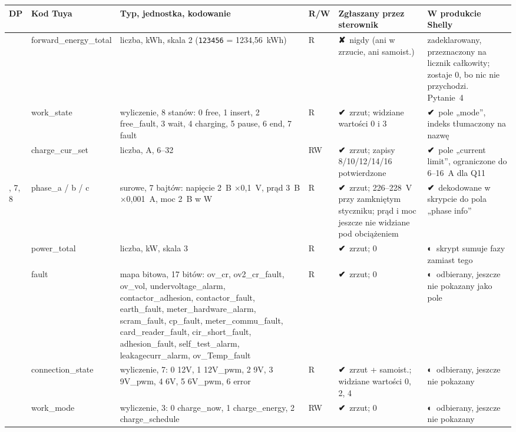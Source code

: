 \documentclass[11pt,a4paper]{article}
\newcommand{\ok}{{\symbolfont\color{apgreen}\textbf{✔}}}
\newcommand{\half}{{\symbolfont\color{apwarn}\textbf{◐}}}
\newcommand{\no}{{\symbolfont\color{apred}\textbf{✘}}}
\newcommand{\hx}[1]{\texttt{#1}}
\begin{document}
\begin{longtable}{>{\raggedright\arraybackslash}p{0.7cm}>{\raggedright\arraybackslash}p{3.1cm}>{\raggedright\arraybackslash}p{3.6cm}>{\raggedright\arraybackslash}p{0.9cm}>{\raggedright\arraybackslash}p{3.2cm}>{\raggedright\arraybackslash}p{3.8cm}}
\toprule
\rowcolor{aphead}\textbf{DP} & \textbf{Kod Tuya} & \textbf{Typ, jednostka, kodowanie} & \textbf{R/W} & \textbf{Zgłaszany przez sterownik} & \textbf{W produkcie Shelly} \\
\midrule\endhead
\bottomrule\endfoot
1 & forward\_\allowbreak energy\_\allowbreak total & liczba, kWh, skala 2 (\hx{123456} = 1234,56~kWh) & R & \no\ nigdy (ani w zrzucie, ani samoist.) & zadeklarowany, przeznaczony na licznik całkowity; zostaje 0, bo nic nie przychodzi. Pytanie~4 \\
3 & work\_state & wyliczenie, 8 stanów: 0 free, 1 insert, 2 free\_fault, 3 wait, 4 charging, 5 pause, 6 end, 7 fault & R & \ok\ zrzut; widziane wartości 0 i 3 & \ok\ pole „mode”, indeks tłumaczony na nazwę \\
4 & charge\_cur\_set & liczba, A, 6--32 & RW & \ok\ zrzut; zapisy 8/10/12/14/16 potwierdzone & \ok\ pole „current limit”, ograniczone do 6--16~A dla Q11 \\
6, 7, 8 & phase\_a / b / c & surowe, 7 bajtów: napięcie 2~B $\times$0,1~V, prąd 3~B $\times$0,001~A, moc 2~B w W & R & \ok\ zrzut; 226--228~V przy zamkniętym styczniku; prąd i moc jeszcze nie widziane pod obciążeniem & \ok\ dekodowane w skrypcie do pola „phase info” \\
9 & power\_total & liczba, kW, skala 3 & R & \ok\ zrzut; 0 & \half\ skrypt sumuje fazy zamiast tego \\
10 & fault & mapa bitowa, 17 bitów: ov\_cr, ov2\_cr\_fault, ov\_vol, undervoltage\_alarm, contactor\_adhesion, contactor\_fault, earth\_fault, meter\_hardware\_alarm, scram\_fault, cp\_fault, meter\_commu\_fault, card\_reader\_fault, cir\_short\_fault, adhesion\_fault, self\_test\_alarm, leakagecurr\_alarm, ov\_Temp\_fault & R & \ok\ zrzut; 0 & \half\ odbierany, jeszcze nie pokazany jako pole \\
13 & connection\_state & wyliczenie, 7: 0 12V, 1 12V\_pwm, 2 9V, 3 9V\_pwm, 4 6V, 5 6V\_pwm, 6 error & R & \ok\ zrzut + samoist.; widziane wartości 0, 2, 4 & \half\ odbierany, jeszcze nie pokazany \\
14 & work\_mode & wyliczenie, 3: 0 charge\_now, 1 charge\_energy, 2 charge\_schedule & RW & \ok\ zrzut; 0 & \half\ odbierany, jeszcze nie pokazany \\

\end{longtable}
\end{document}
